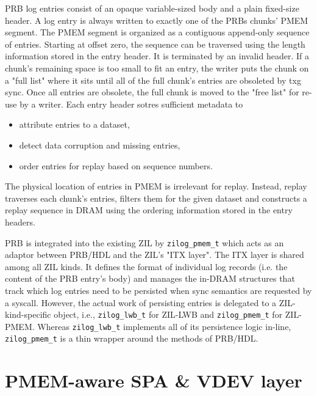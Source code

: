 \documentclass[12pt,a4paper,twoside,draft]{book}
\begin{document}
PRB log entries consist of an opaque variable-sized body and a plain fixed-size header.
A log entry is always written to exactly one of the PRBs chunks' PMEM segment.
The PMEM segment is organized as a contiguous append-only sequence of entries.
Starting at offset zero, the sequence can be traversed using the length information stored in the entry header.
It is terminated by an invalid header.
If a chunk's remaining space is too small to fit an entry, the writer puts the chunk on a "full list" where it sits until all of the full chunk's entries are obsoleted by txg sync.
Once all entries are obsolete, the full chunk is moved to the "free list" for re-use by a writer.
Each entry header sotres sufficient metadata to
\begin{itemize}
\item attribute entries to a dataset, %
\item detect data corruption and missing entries,
\item order entries for replay based on sequence numbers.
\end{itemize}
The physical location of entries in PMEM is irrelevant for replay.
Instead, replay traverses each chunk's entries, filters them for the given dataset and constructs a replay sequence in DRAM using the ordering information stored in the entry headers.

PRB is integrated into the existing ZIL by \lstinline{zilog_pmem_t} which acts as an adaptor between PRB/HDL and the ZIL's "ITX layer".
The ITX layer is shared among all ZIL kinds.
It defines the format of individual log records (i.e. the content of the PRB entry's body) and manages the in-DRAM structures that track which log entries need to be persisted when sync semantics are requested by a syscall.
However, the actual work of persisting entries is delegated to a ZIL-kind-specific object, i.e., \lstinline{zilog_lwb_t} for ZIL-LWB and \lstinline{zilog_pmem_t} for ZIL-PMEM.
Whereas \lstinline{zilog_lwb_t} implements all of its persistence logic in-line, \lstinline{zilog_pmem_t} is a thin wrapper around the methods of PRB/HDL.

\section{PMEM-aware SPA \& VDEV layer}
\end{document}
